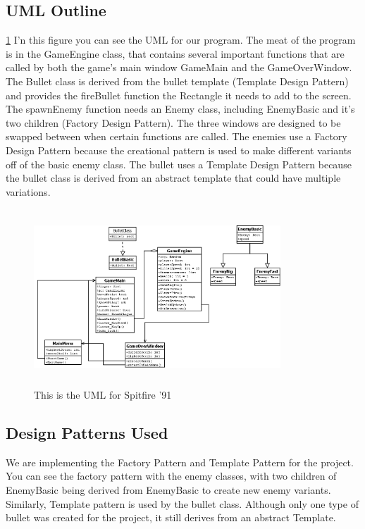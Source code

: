 \documentclass[10pt,conference,onecolumn,compsoc]{IEEEtran}
\begin{document}
\subsection{UML Outline}
\ref {UML}
I'n this figure you can see the UML for our program. The meat of the program is in the GameEngine class, that contains several important functions that are called by both the game's main window GameMain and the GameOverWindow. The Bullet class is derived from the bullet template (Template Design Pattern) and provides the fireBullet function the Rectangle it needs to add to the screen. The spawnEnemy function needs an Enemy class, including EnemyBasic and it's two children (Factory Design Pattern). The three windows are designed to be swapped between when certain functions are called. The enemies use a Factory Design Pattern because the creational pattern is used to make different variants off of the basic enemy class. The bullet uses a Template Design Pattern because the bullet class is derived from an abstract template that could have multiple variations.
\begin{figure}[ht!]
\includegraphics[height=250px, width=350px]{DIA.png}
\caption{This is the UML for Spitfire '91}
\label{UML}
\end{figure}

\subsection{Design Patterns Used}
We are implementing the Factory Pattern and Template Pattern for the project. You can see the factory pattern with the enemy classes, with two children of EnemyBasic being derived from EnemyBasic to create new enemy variants. Similarly, Template pattern is used by the bullet class. Although only one type of bullet was created for the project, it still derives from an abstract Template.
\end{document}
